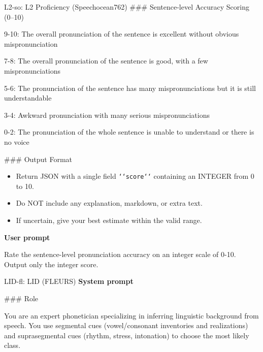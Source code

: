 {\begin{promptbox}{L2-so: L2 Proficiency (Speechocean762)}
\noindent\#\#\# Sentence-level Accuracy Scoring (0--10)
\par
\hspace*{1em}9-10: The overall pronunciation of the sentence is excellent without obvious mispronunciation\par
\hspace*{1em}7-8: The overall pronunciation of the sentence is good, with a few mispronunciations\par
\hspace*{1em}5-6: The pronunciation of the sentence has many mispronunciations but it is still understandable\par
\hspace*{1em}3-4: Awkward pronunciation with many serious mispronunciations\par
\hspace*{1em}0-2: The pronunciation of the whole sentence is unable to understand or there is no voice
\par\vspace{2pt}

\noindent\#\#\# Output Format
\par
\begin{itemize}[leftmargin=*,noitemsep,topsep=2pt]
  \item Return JSON with a single field \texttt{\string`\string`score\string`\string`} containing an INTEGER from 0 to 10.
  \item Do NOT include any explanation, markdown, or extra text.
  \item If uncertain, give your best estimate within the valid range.
\end{itemize}

\par\vspace{2pt}
\textbf{User prompt}\par\vspace{2pt}
\noindent
Rate the sentence-level pronunciation accuracy on an integer scale of 0-10. Output only the integer score.
\end{promptbox}

\par\vspace{4pt}
\begin{promptbox}{LID-fl: LID (FLEURS)}
\textbf{System prompt}\par\vspace{2pt}
\noindent\#\#\# Role
\par
You are an expert phonetician specializing in inferring linguistic background from speech. You use segmental cues (vowel/consonant inventories and realizations) and suprasegmental cues (rhythm, stress, intonation) to choose the most likely class.
\par\vspace{2pt}


\end{promptbox}}
